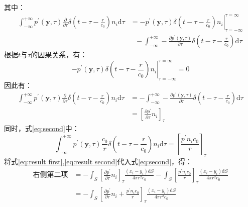 其中：
\begin{equation}
    \label{eq:int p multi delt partial tau}
    \begin{aligned}
        \int_{-\infty}^{+\infty} p^{\prime}(\mathbf{y}, \tau) \frac{\partial}{\partial \tau} \delta\left(t-\tau-\frac{r}{c_{0}} \right) n_i \mathrm{d} \tau &=  \left.-p^{\prime}(\mathbf{y}, \tau)\delta(t-\tau-\frac{r}{c_0}) n_i \right|_{\tau = -\infty}^{\tau = \infty} \\
        &{~~~} - \int_{-\infty}^{+\infty} -\frac{\partial p^{\prime}(\mathbf{y}, \tau)}{\partial \tau}\delta(t-\tau-\frac{r}{c_0}) \mathrm{d}\tau
    \end{aligned}
\end{equation}
根据$t$与$\tau$的因果关系，有：
\begin{equation}
    \left.-p^{\prime}(\mathbf{y}, \tau)\delta(t-\tau-\frac{r}{c_0}) n_i \right|_{\tau = -\infty}^{\tau = \infty} = 0
\end{equation}
因此有：
\begin{equation}
    \label{eq:result first}
    \begin{aligned}
        \int_{-\infty}^{+\infty} p^{\prime}(\mathbf{y}, \tau) \frac{\partial}{\partial \tau} \delta\left(t-\tau-\frac{r}{c_{0}} \right) n_i \mathrm{d} \tau &=
        - \int_{-\infty}^{+\infty} -\frac{\partial p^{\prime}(\mathbf{y}, \tau)}{\partial \tau}\delta(t-\tau-\frac{r}{c_0}) \mathrm{d}\tau \\
        &= \left[ \frac{\partial p^{\prime}}{\partial \tau} n_i \right]_{\tau}
    \end{aligned}
\end{equation}
同时，式\eqref{eq:second}中：
\begin{equation}
    \label{eq:result second}
    \int_{-\infty}^{+\infty} p^{\prime}(\mathbf{y}, \tau) \frac{c_0}{r} \delta\left(t-\tau-\frac{r}{c_{0}} \right) n_i \mathrm{d} \tau
    = \left[ \frac{p^{\prime} n_i c_0}{r}\right]_{\tau}
\end{equation}
将式\eqref{eq:result first},\eqref{eq:result second}代入式\eqref{eq:second}，得：
\begin{equation}
    \label{eq:right second final}
    \begin{aligned}
        \mbox{右侧第二项} &= -\int_S  \left[ \frac{\partial p^{\prime}}{\partial \tau} n_i \right]_{\tau} \frac{\left( x_{i}-y_{i} \right) \mathrm{d} S}{4 \pi r^2 c_{0}} 
        -\int_S  \left[ \frac{p^{\prime} n_i c_0}{r}\right]_{\tau} \frac{\left( x_{i}-y_{i} \right) \mathrm{d} S}{4 \pi r^2 c_{0}} \\
        &= -\int_S  \left[ \frac{\partial p^{\prime}}{\partial \tau} n_i + \frac{p^{\prime} n_i c_0}{r} \right]_{\tau} \frac{\left( x_{i}-y_{i} \right) \mathrm{d} S}{4 \pi r^2 c_{0}}
    \end{aligned}
\end{equation}
